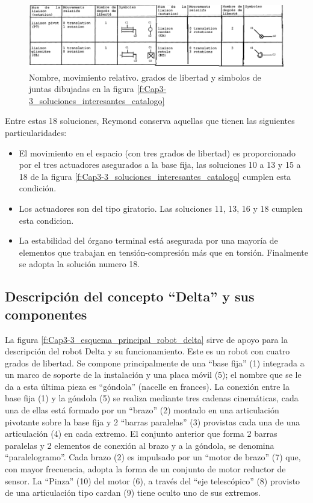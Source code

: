       \begin{figure}[htb]
        \centering
        \includegraphics[width=0.8\linewidth]{Main/Chapter4/Images4/juntas.png}
        \caption{Nombre, movimiento relativo. grados de libertad y simbolos de juntas dibujadas en la figura  \eqref{f:Cap3-3_soluciones_interesantes_catalogo}  \cite{Clavel:31403}}
        \label{f:Cap3-3_soluciones_interesantes_catalogo_JUNTAS}
    \end{figure}
 
 Entre estas 18 soluciones, Reymond conserva aquellas que tienen las siguientes particularidades:   
    \begin{itemize}
        \item El movimiento en el espacio (con tres grados de libertad) es proporcionado por el tres actuadores asegurados a la base fija, las soluciones 10 a 13 y 15 a 18 de la figura \eqref{f:Cap3-3_soluciones_interesantes_catalogo} cumplen esta condición.
        \item Los actuadores son del tipo giratorio. Las soluciones 11, 13, 16 y 18 cumplen esta condicion.
        \item La estabilidad del órgano terminal está asegurada por una mayoría de elementos que trabajan en tensión-compresión más que en torsión. Finalmente se adopta la solución numero 18.
    \end{itemize}
    

    
        \newpage
    
    \subsection{Descripción del concepto ``Delta'' y sus componentes}
    La figura \eqref{f:Cap3-3_esquema_principal_robot_delta} sirve de apoyo para la descripción del robot Delta y su funcionamiento. Este es un robot con cuatro grados de libertad. Se compone principalmente de una ``base fija'' (1) integrada a un marco de soporte de la instalación y una placa móvil (5); el nombre que se le da a esta última pieza es ``góndola'' (nacelle en frances). La conexión entre la base fija (1) y la góndola (5) se realiza mediante tres cadenas cinemáticas, cada una de ellas está formado por un ``brazo'' (2) montado en una articulación pivotante sobre la base fija y 2 ``barras paralelas'' (3) provistas cada una de una articulación (4) en cada extremo. El conjunto anterior que forma 2 barras paralelas y 2 elementos de conexión al brazo y a la góndola, se denomina ``paralelogramo''. Cada brazo (2) es impulsado por un ``motor de brazo'' (7) que, con mayor frecuencia, adopta la forma de un conjunto de motor reductor de sensor. La ``Pinza'' (10) del motor (6), a través del ``eje telescópico'' (8) provisto de una articulación tipo cardan (9) tiene oculto uno de sus extremos.

